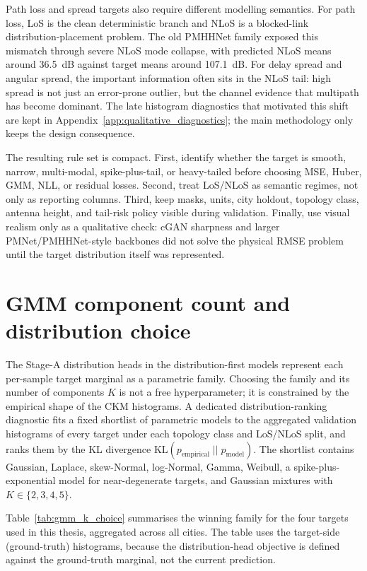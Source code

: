 Path loss and spread targets also require different modelling semantics. For
path loss, LoS is the clean deterministic branch and NLoS is a blocked-link
distribution-placement problem. The old PMHHNet family exposed this mismatch
through severe NLoS mode collapse, with predicted NLoS means around
\SI{36.5}{dB} against target means around \SI{107.1}{dB}. For delay spread
and angular spread, the important information often sits in the NLoS tail:
high spread is not just an error-prone outlier, but the channel evidence that
multipath has become dominant. The late histogram diagnostics that motivated
this shift are kept in Appendix~\ref{app:qualitative_diagnostics}; the main
methodology only keeps the design consequence.

The resulting rule set is compact. First, identify whether the target is
smooth, narrow, multi-modal, spike-plus-tail, or heavy-tailed before choosing
MSE, Huber, GMM, NLL, or residual losses. Second, treat LoS/NLoS as semantic
regimes, not only as reporting columns. Third, keep masks, units, city
holdout, topology class, antenna height, and tail-risk policy visible during
validation. Finally, use visual realism only as a qualitative check: cGAN
sharpness and larger PMNet/PMHHNet-style backbones did not solve the physical
RMSE problem until the target distribution itself was represented.

\section{GMM component count and distribution choice}
\label{sec:gmm_k_choice}

The Stage-A distribution heads in the distribution-first models
represent each per-sample target marginal as a parametric family. Choosing
the family and its number of components $K$ is not a free hyperparameter; it
is constrained by the empirical shape of the CKM histograms. A dedicated
distribution-ranking diagnostic fits a fixed shortlist of parametric models
to the aggregated validation histograms of every target under each topology
class and LoS/NLoS split, and ranks them by the KL divergence
\(\mathrm{KL}(p_{\mathrm{empirical}}\;||\;p_{\mathrm{model}})\).  The shortlist
contains Gaussian, Laplace, skew-Normal, log-Normal, Gamma, Weibull, a
spike-plus-exponential model for near-degenerate targets, and Gaussian
mixtures with $K\in\{2,3,4,5\}$.

Table~\ref{tab:gmm_k_choice} summarises the winning family for the four
targets used in this thesis, aggregated across all cities. The table uses the
target-side (ground-truth) histograms, because the distribution-head objective
is defined against the ground-truth marginal, not the current prediction.

